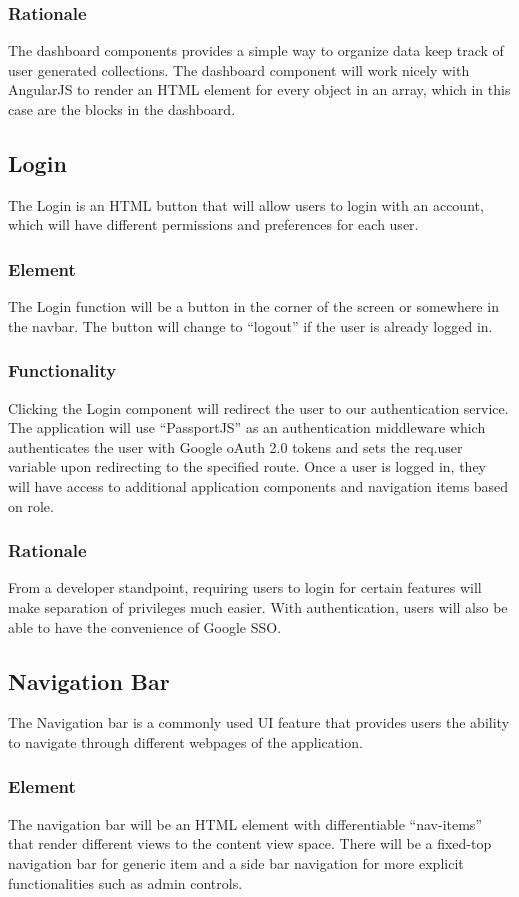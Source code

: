 \documentclass[journal,10pt,onecolumn,compsoc]{IEEEtran}
\begin{document}
			\subsubsection{Rationale} 
				The dashboard components provides a simple way to organize data keep track of user generated collections. 
				The dashboard component will work nicely with AngularJS to render an HTML element for every object in an array, which in this case are the blocks in the dashboard.
	
		\subsection{Login}
			The Login is an HTML button that will allow users to login with an account, which will have different permissions and preferences for each user.
			\subsubsection{Element}
				The Login function will be a button in the corner of the screen or somewhere in the navbar. The button will change to ``logout'' if the user is already logged in.
			\subsubsection{Functionality}
				Clicking the Login component will redirect the user to our authentication service. 
				The application will use ``PassportJS'' as an authentication middleware which authenticates the user with Google oAuth 2.0 tokens and sets the req.user variable upon redirecting to the specified route. 
				Once a user is logged in, they will have access to additional application components and navigation items based on role.
			\subsubsection{Rationale}
				From a developer standpoint, requiring users to login for certain features will make separation of privileges much easier. With authentication, users will also be able to have the convenience of Google SSO.
	
		\subsection{Navigation Bar}
			The Navigation bar is a commonly used UI feature that provides users the ability to navigate through different webpages of the application.
			\subsubsection{Element}
				The navigation bar will be an HTML element with differentiable ``nav-items'' that render different views to the content view space. There will be a fixed-top navigation bar for generic item and a side bar navigation for more explicit functionalities such as admin controls. 
\end{document}
